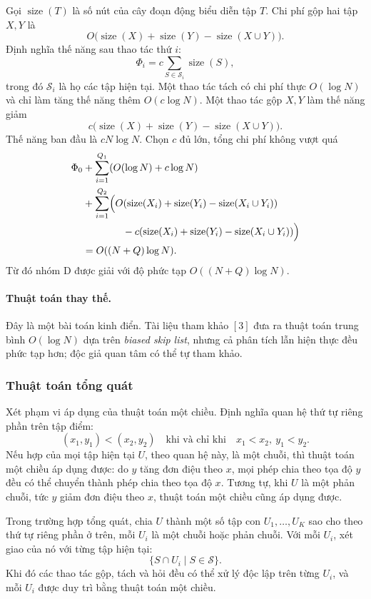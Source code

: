 \documentclass[11pt]{article}
\begin{document}
Gọi \(\operatorname{size}(T)\) là số nút của cây đoạn động biểu diễn tập \(T\).
Chi phí gộp hai tập \(X,Y\) là
\[
  O\bigl(\operatorname{size}(X)+\operatorname{size}(Y)-
  \operatorname{size}(X\cup Y)\bigr).
\]
Định nghĩa thế năng sau thao tác thứ \(i\):
\[
  \Phi_i=c\sum_{S\in\mathcal{S}_i}\operatorname{size}(S),
\]
trong đó \(\mathcal{S}_i\) là họ các tập hiện tại. Một thao tác tách có chi phí
thực \(O(\log N)\) và chỉ làm tăng thế năng thêm \(O(c\log N)\). Một thao tác
gộp \(X,Y\) làm thế năng giảm
\[
  c\bigl(\operatorname{size}(X)+\operatorname{size}(Y)-
  \operatorname{size}(X\cup Y)\bigr).
\]
Thế năng ban đầu là \(cN\log N\). Chọn \(c\) đủ lớn, tổng chi phí không vượt quá
\[
\begin{aligned}
\Phi_0
&+\sum_{i=1}^{Q_1}(O(\log N)+c\log N)\\
&+\sum_{i=1}^{Q_2}
\Bigl(O(\operatorname{size}(X_i)+\operatorname{size}(Y_i)-
\operatorname{size}(X_i\cup Y_i))\\
&\qquad\qquad
-c(\operatorname{size}(X_i)+\operatorname{size}(Y_i)-
\operatorname{size}(X_i\cup Y_i))\Bigr)\\
&=O((N+Q)\log N).
\end{aligned}
\]
Từ đó nhóm D được giải với độ phức tạp \(O((N+Q)\log N)\).

\paragraph{Thuật toán thay thế.}
Đây là một bài toán kinh điển. Tài liệu tham khảo \([3]\) đưa ra thuật toán
trung bình \(O(\log N)\) dựa trên \emph{biased skip list}, nhưng cả phân tích
lẫn hiện thực đều phức tạp hơn; độc giả quan tâm có thể tự tham khảo.

\subsubsection{Thuật toán tổng quát}

Xét phạm vi áp dụng của thuật toán một chiều. Định nghĩa quan hệ thứ tự riêng
phần trên tập điểm:
\[
  (x_1,y_1)<(x_2,y_2)\quad\text{khi và chỉ khi}\quad x_1<x_2,\ y_1<y_2.
\]
Nếu hợp của mọi tập hiện tại \(U\), theo quan hệ này, là một chuỗi, thì thuật
toán một chiều áp dụng được: do \(y\) tăng đơn điệu theo \(x\), mọi phép chia
theo tọa độ \(y\) đều có thể chuyển thành phép chia theo tọa độ \(x\). Tương tự,
khi \(U\) là một phản chuỗi, tức \(y\) giảm đơn điệu theo \(x\), thuật toán một
chiều cũng áp dụng được.

Trong trường hợp tổng quát, chia \(U\) thành một số tập con \(U_1,\ldots,U_K\)
sao cho theo thứ tự riêng phần ở trên, mỗi \(U_i\) là một chuỗi hoặc phản
chuỗi. Với mỗi \(U_i\), xét giao của nó với từng tập hiện tại:
\[
  \{S\cap U_i\mid S\in\mathcal{S}\}.
\]
Khi đó các thao tác gộp, tách và hỏi đều có thể xử lý độc lập trên từng \(U_i\),
và mỗi \(U_i\) được duy trì bằng thuật toán một chiều.
\end{document}
